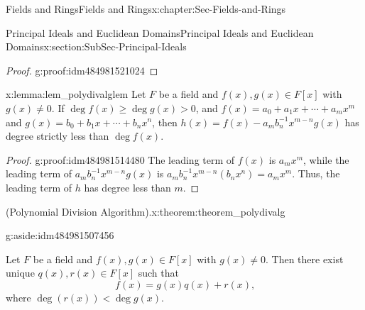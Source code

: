 \documentclass[oneside,10pt,]{book}
\numberwithin{equation}{section}
\renewcommand{\ge}{\geqslant}
\newcommand{\lt}{<}
\begin{document}
\begin{chapterptx}{Fields and Rings}{}{Fields and Rings}{}{}{x:chapter:Sec-Fields-and-Rings}
\begin{sectionptx}{Principal Ideals and Euclidean Domains}{}{Principal Ideals and Euclidean Domains}{}{}{x:section:SubSec-Principal-Ideals}
\begin{proof}{}{g:proof:idm484981521024}
\end{proof}
\begin{lemma}{}{}{x:lemma:lem_polydivalglem}%
Let \(F\) be a field and \(f(x),g(x)\in F[x]\) with \(g(x)\ne 0\). If \(\deg f(x) \ge \deg g(x) > 0\), and \(f(x) = a_0 + a_1 x + \cdots + a_m x^m\) and \(g(x) = b_0 + b_1 x + \cdots + b_n x^n\), then \(h(x) = f(x) - a_m b_n^{-1} x^{m-n} g(x)\) has degree strictly less than \(\deg f(x)\).%
\end{lemma}
\begin{proof}{}{g:proof:idm484981514480}
The leading term of \(f(x)\) is \(a_m x^m\), while the leading term of \(a_m b_n^{-1} x^{m-n} g(x)\) is \(a_m b_n^{-1} x^{m-n} (b_n x^n) = a_m x^m\). Thus, the leading term of \(h\) has degree less than \(m\).%
\end{proof}
\begin{theorem}{(Polynomial Division Algorithm).}{}{x:theorem:theorem_polydivalg}%
\begin{aside}{}{g:aside:idm484981507456}%
\end{aside}
Let \(F\) be a field and \(f(x),g(x)\in F[x]\) with \(g(x)\ne 0\). Then there exist unique \(q(x),
r(x) \in F[x]\) such that%
\begin{equation*}
f(x) = g(x) q(x) + r(x)\text{,}
\end{equation*}
where \(\deg(r(x)) \lt  \deg g(x)\).%


\end{theorem}
\end{sectionptx}
\end{chapterptx}
\end{document}

